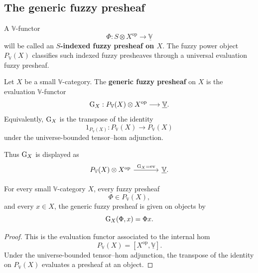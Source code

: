 \subsection{The generic fuzzy presheaf}
\label{subsec:generic-fuzzy-presheaf}

A \(\mathbb V\)-functor
\[
    \Phi:S\otimes X^{\mathrm{op}}\to\underline{\mathbb V}
\]
will be called an \textbf{\(S\)-indexed fuzzy presheaf on \(X\)}. The fuzzy power object \(P_{\mathbb V}(X)\) classifies such indexed fuzzy presheaves through a universal evaluation fuzzy presheaf.

\begin{definition}
\label{def:generic-fuzzy-presheaf}
    Let \(X\) be a small \(\mathbb V\)-category. The \textbf{generic fuzzy presheaf} on \(X\) is the evaluation \(\mathbb V\)-functor
    \[
        \operatorname{G}_X:P_{\mathbb V}(X)\otimes X^{\mathrm{op}}
        \longrightarrow
        \underline{\mathbb V}.
    \]
    Equivalently, \(\operatorname{G}_X\) is the transpose of the identity
    \[
        1_{P_{\mathbb V}(X)}:P_{\mathbb V}(X)\to P_{\mathbb V}(X)
    \]
    under the universe-bounded tensor--hom adjunction.
\end{definition}

Thus \(\operatorname{G}_X\) is displayed as
\[
    \begin{tikzcd}[column sep=large]
        P_{\mathbb V}(X)\otimes X^{\mathrm{op}}
            \arrow[r,"\Gen_X=\operatorname{ev}"]
        &
        \underline{\mathbb V}.
    \end{tikzcd}
\]

\begin{proposition}
\label{prop:generic-fuzzy-presheaf-is-evaluation}
    For every small \(\mathbb V\)-category \(X\), every fuzzy presheaf
    \[
        \Phi\in P_{\mathbb V}(X),
    \]
    and every \(x\in X\), the generic fuzzy presheaf is given on objects by
    \[
        \operatorname{G}_X(\Phi,x)=\Phi x.
    \]
\end{proposition}

\begin{proof}
    This is the evaluation functor associated to the internal hom
    \[
        P_{\mathbb V}(X)=[X^{\mathrm{op}},\underline{\mathbb V}].
    \]
    Under the universe-bounded tensor--hom adjunction, the transpose of the identity on \(P_{\mathbb V}(X)\) evaluates a presheaf at an object.
\end{proof}

